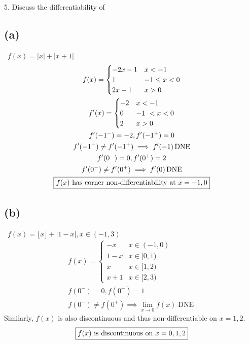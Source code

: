 \documentclass[12pt]{article}
\newcommand*{\limit}[2][x]{\ensuremath{\displaystyle\lim_{#1\to#2}}}
\newcommand{\floor}[1]{\lfloor #1 \rfloor}
\newcommand{\vem}{\vspace{0.5em}}
\newcommand{\subproblem}[1]{\subsection{(#1)} \,}
\DeclareMathOperator{\dne}{DNE}
\begin{document}
5. Discuss the differentiability of \vem
\subproblem{a} $f(x)=|x|+|x+1|$
\begin{gather*}
    f(x)=\begin{cases}
        -2x-1 &x<-1\\
        1 & -1\le x < 0\\
        2x+1 &x>0
    \end{cases}\\
    f'(x)=\begin{cases}
        -2 &x<-1\\
        0 & -1\ <x < 0\\
        2 &x>0
    \end{cases}\\
    f'(-1^-)=-2, f'(-1^+)=0\\
    f'(-1^-) \ne f'(-1^+) \implies f'(-1) \dne\\
    f'(0^-)=0, f'(0^+)=2\\
    f'(0^-) \ne f'(0^+) \implies f'(0) \dne\\
    \boxed{f(x) $ has corner non-differentiability at $ x=-1,0}
\end{gather*}

\subproblem{b} $f(x)=\floor{x}+|1-x|, x\in (-1,3)$
\begin{gather*}
    f(x)=\begin{cases}
        -x &x\in (-1,0)\\
        1-x &x\in [0,1)\\
        x &x \in [1,2)\\
        x+1 & x \in [2,3)
    \end{cases}\\
    f(0^-)=0, f(0^+)=1\\
    f(0^-) \ne f(0^+) \implies \limit 0 f(x) \dne 
\end{gather*}
Similarly, $f(x)$ is also discontinuous and thus non-differentiable on $x=1,2$.
\begin{equation*}
    \boxed{f(x) $ is discontinuous on $ x=0,1,2}
\end{equation*}
\end{document}
